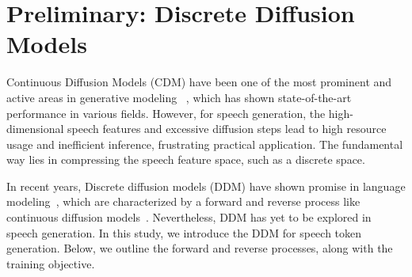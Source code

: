 \section{Preliminary: Discrete Diffusion Models}
\label{sec:ap_discrete_diffusion}

Continuous Diffusion Models (CDM) have been one of the most prominent and active areas in generative modeling~\cite{videodiff_latent/BlattmannRLD0FK23,styletts2/LiHRMM23,mmgeneration/RuanMYH0FYJG23}
, which has shown state-of-the-art performance in various fields. 
However, for speech generation, the high-dimensional speech features and excessive diffusion steps lead to high resource usage and inefficient inference, frustrating practical application. 
The fundamental way lies in compressing the speech feature space, such as a discrete space. 

In recent years, Discrete diffusion models (DDM) have shown promise in language modeling~\cite{D3PM:conf/nips/AustinJHTB21,ConcreteScoreMatch:conf/nips/MengCSE22,SEDD:conf/icml/LouME24,RADD:journals/corr/abs-2406-03736}, which are characterized by a forward and reverse process like continuous diffusion models~\cite{DDIM/SongME21,DDPM/HoJA20}. Nevertheless, DDM has yet to be explored in speech generation. In this study, we introduce the DDM for speech token generation. Below, we outline the forward and reverse processes, along with the training objective.

